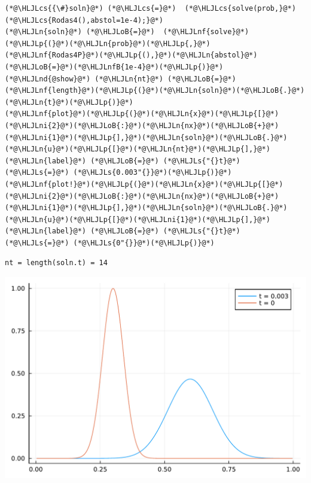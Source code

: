 \documentclass[12pt,a4paper]{article}
\newcommand{\HLJLn}[1]{#1}
\newcommand{\HLJLnd}[1]{\textcolor[RGB]{214,102,97}{#1}}
\newcommand{\HLJLnf}[1]{\textcolor[RGB]{66,102,213}{#1}}
\newcommand{\HLJLs}[1]{\textcolor[RGB]{201,61,57}{#1}}
\newcommand{\HLJLnfB}[1]{\textcolor[RGB]{59,151,46}{#1}}
\newcommand{\HLJLni}[1]{\textcolor[RGB]{59,151,46}{#1}}
\newcommand{\HLJLoB}[1]{\textcolor[RGB]{102,102,102}{\textbf{#1}}}
\newcommand{\HLJLp}[1]{#1}
\newcommand{\HLJLcs}[1]{\textcolor[RGB]{153,153,119}{\textit{#1}}}
\begin{document}
\begin{lstlisting}
(*@\HLJLcs{{\#}soln}@*) (*@\HLJLcs{=}@*)  (*@\HLJLcs{solve(prob,}@*) (*@\HLJLcs{Rodas4(),abstol=1e-4);}@*)
(*@\HLJLn{soln}@*) (*@\HLJLoB{=}@*)  (*@\HLJLnf{solve}@*)(*@\HLJLp{(}@*)(*@\HLJLn{prob}@*)(*@\HLJLp{,}@*) (*@\HLJLnf{Rodas4P}@*)(*@\HLJLp{(),}@*)(*@\HLJLn{abstol}@*)(*@\HLJLoB{=}@*)(*@\HLJLnfB{1e-4}@*)(*@\HLJLp{)}@*)
(*@\HLJLnd{@show}@*) (*@\HLJLn{nt}@*) (*@\HLJLoB{=}@*) (*@\HLJLnf{length}@*)(*@\HLJLp{(}@*)(*@\HLJLn{soln}@*)(*@\HLJLoB{.}@*)(*@\HLJLn{t}@*)(*@\HLJLp{)}@*)
(*@\HLJLnf{plot}@*)(*@\HLJLp{(}@*)(*@\HLJLn{x}@*)(*@\HLJLp{[}@*)(*@\HLJLni{2}@*)(*@\HLJLoB{:}@*)(*@\HLJLn{nx}@*)(*@\HLJLoB{+}@*)(*@\HLJLni{1}@*)(*@\HLJLp{],}@*)(*@\HLJLn{soln}@*)(*@\HLJLoB{.}@*)(*@\HLJLn{u}@*)(*@\HLJLp{[}@*)(*@\HLJLn{nt}@*)(*@\HLJLp{],}@*)(*@\HLJLn{label}@*) (*@\HLJLoB{=}@*) (*@\HLJLs{"{}t}@*) (*@\HLJLs{=}@*) (*@\HLJLs{0.003"{}}@*)(*@\HLJLp{)}@*)
(*@\HLJLnf{plot!}@*)(*@\HLJLp{(}@*)(*@\HLJLn{x}@*)(*@\HLJLp{[}@*)(*@\HLJLni{2}@*)(*@\HLJLoB{:}@*)(*@\HLJLn{nx}@*)(*@\HLJLoB{+}@*)(*@\HLJLni{1}@*)(*@\HLJLp{],}@*)(*@\HLJLn{soln}@*)(*@\HLJLoB{.}@*)(*@\HLJLn{u}@*)(*@\HLJLp{[}@*)(*@\HLJLni{1}@*)(*@\HLJLp{],}@*)(*@\HLJLn{label}@*) (*@\HLJLoB{=}@*) (*@\HLJLs{"{}t}@*) (*@\HLJLs{=}@*) (*@\HLJLs{0"{}}@*)(*@\HLJLp{)}@*)
\end{lstlisting}

\begin{lstlisting}
nt = length(soln.t) = 14
\end{lstlisting}

\includegraphics[width=\linewidth]{jl_nS6THr/Problem_Sheet2_Solutions_2025t_1_1.pdf}
\end{document}

